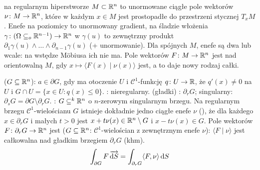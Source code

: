   na regularnym hiperstworze $M \subset \mathbb{R}^n$ to unormowane ciągłe pole wektorów $\nu \colon M \to \mathbb{R}^n$, które w każdym $x \in M$ jest prostopadłe do przestrzeni stycznej $T_xM$.
Enefe na poziomicy to unormowany gradient, na śladzie włożenia $\gamma \colon (\Omega \subseteq_o \mathbb{R}^{n-1}) \to \mathbb{R}^n$ w $\gamma (u)$ to zewnętrzny produkt $\partial_1 \gamma(u) \wedge \ldots \wedge \partial_{n-1} \gamma(u)$ (+ unormowanie).
Dla spójnych $M$, enefe są dwa lub wcale: na wstędze Möbiusa ich nie ma.
Pole wektorów $F \colon M \to \mathbb{R}^n$ jest  nad orientowalną $M$, gdy $x \mapsto \langle F(x) \mid \nu(x) \rangle$ jest, a to daje nowy rodzaj całki.

  ($G \subseteq \mathbb{R}^n$): $a \in \partial G$, gdy ma otoczenie $U$ i $\mathscr C^1$-funkcję $q \colon U \to \mathbb{R}$, że $q'(x) \neq 0$ na $U$ i $G \cap U = \{x \in U : q(x) \le 0\}$.
: nieregularny.
 (gładki) : $\partial_r G$; singularny: $\partial_s G = \partial G \setminus \partial_r G$.
: $G \subseteq^k \mathbb{R}^n$ o $n$-zerowym singularnym brzegu.
Na regularnym brzegu $\mathscr C^1$-wielościanu $G$ istnieje dokładnie jedno ciągłe enefe $\nu$ (), że dla każdego $x \in \partial_r G$ i małych $t > 0$ jest $x + t \nu(x) \in \mathbb{R}^n\setminus G$ i $x - t \nu(x) \in G$.
Pole wektorów $F \colon \partial_r G \to \mathbb{R}^n$ jest  ($G \subseteq \mathbb{R}^n$: $\mathscr C^1$-wielościan z zewnętrznym enefe $\nu$): $\langle F \mid \nu \rangle$ jest całkowalna nad gładkim brzegiem $\partial_r G$ (khm).
\[
	\int_{\partial G} F \, \overrightarrow{\textrm{d} S} = \int_{\partial_r G} \langle F, \nu \rangle \,\textrm{d} S
\]

